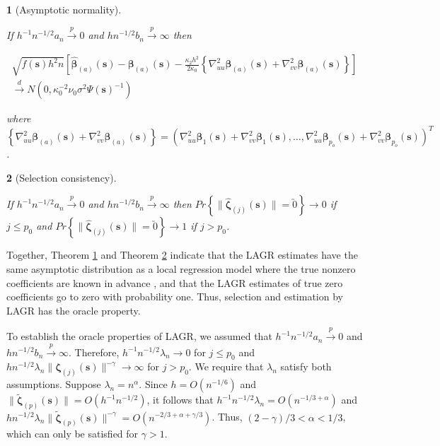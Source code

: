 \documentclass[12pt,english,authoryear, review]{article}\usepackage[]{graphicx}\usepackage[]{color}
\theoremstyle{plain}
\newtheorem{thm}{\protect\theoremname}
\theoremstyle{plain}
\providecommand{\theoremname}{Theorem}
\begin{document}
\begin{thm}[Asymptotic normality]
\label{theorem:normality} 



If $h^{-1}n^{-1/2}a_{n}\xrightarrow{p}0$ and $hn^{-1/2}b_{n}\xrightarrow{p}\infty$
then

\begin{multline*}
\sqrt{f\left(\bm{s}\right)h^{2}n}\left[\hat{\bm{\beta}}_{\left(a\right)}\left(\bm{s}\right)-\bm{\beta}_{\left(a\right)}\left(\bm{s}\right)-\frac{\kappa_{2}h^{2}}{2\kappa_{0}}\left\{ \nabla_{uu}^{2}\bm{\beta}_{\left(a\right)}\left(\bm{s}\right)+\nabla_{vv}^{2}\bm{\beta}_{\left(a\right)}\left(\bm{s}\right)\right\} \right]\\
\xrightarrow{d}N\left(0,\kappa_{0}^{-2}\nu_{0}\sigma^{2}\Psi\left(\bm{s}\right)^{-1}\right)
\end{multline*}


where $\left\{ \nabla_{uu}^{2}\bm{\beta}_{\left(a\right)}\left(\bm{s}\right)+\nabla_{vv}^{2}\bm{\beta}_{\left(a\right)}\left(\bm{s}\right)\right\} =\left(\nabla_{uu}^{2}\bm{\beta}_{1}\left(\bm{s}\right)+\nabla_{vv}^{2}\bm{\beta}_{1}\left(\bm{s}\right),\dots,\nabla_{uu}^{2}\bm{\beta}_{p_{o}}\left(\bm{s}\right)+\nabla_{vv}^{2}\bm{\beta}_{p_{o}}\left(\bm{s}\right)\right)^{T}$.
\end{thm}

\begin{thm}[Selection consistency]
\label{theorem:selection}



If $h^{-1}n^{-1/2}a_{n}\xrightarrow{p}0$ and $hn^{-1/2}b_{n}\xrightarrow{p}\infty$
then $Pr\left\{ \|\hat{\bm{\zeta}}_{\left(j\right)}\left(\bm{s}\right)\|=\utilde{0}\right\} \to0$
if $j\le p_{0}$ and $Pr\left\{ \|\hat{\bm{\zeta}}_{\left(j\right)}\left(\bm{s}\right)\|=\utilde{0}\right\} \to1$
if $j>p_{0}$. 
\end{thm}
Together, Theorem \ref{theorem:normality} and Theorem \ref{theorem:selection}
indicate that the LAGR estimates have the same asymptotic distribution
as a local regression model where the true nonzero coefficients are
known in advance \citep{Sun-Yan-Zhang-Lu-2014}, and that the LAGR
estimates of true zero coefficients go to zero with probability one.
Thus, selection and estimation by LAGR has the oracle property.

To establish the oracle properties of LAGR, we assumed that $h^{-1}n^{-1/2}a_{n}\xrightarrow{p}0$
and $hn^{-1/2}b_{n}\xrightarrow{p}\infty$. Therefore, $h^{-1}n^{-1/2}\lambda_{n}\to0$
for $j\le p_{0}$ and $hn^{-1/2}\lambda_{n}\|\bm{\zeta}_{\left(j\right)}\left(\bm{s}\right)\|^{-\gamma}\to\infty$
for $j>p_{0}$. We require that $\lambda_{n}$ satisfy both assumptions.
Suppose $\lambda_{n}=n^{\alpha}$. Since $h=O\left(n^{-1/6}\right)$
and $\|\tilde{\bm{\zeta}}_{\left(p\right)}(\bm{s})\|=O\left(h^{-1}n^{-1/2}\right)$,
it follows that $h^{-1}n^{-1/2}\lambda_{n}=O\left(n^{-1/3+\alpha}\right)$
and $hn^{-1/2}\lambda_{n}\|\tilde{\bm{\zeta}}_{\left(p\right)}\left(\bm{s}\right)\|^{-\gamma}=O\left(n^{-2/3+\alpha+\gamma/3}\right)$.
Thus, $\left(2-\gamma\right)/3<\alpha<1/3$, which can only be satisfied
for $\gamma>1$.
\end{document}
